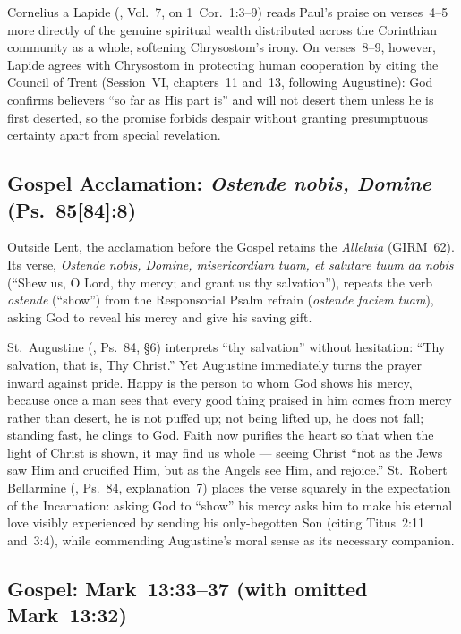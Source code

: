 Cornelius a Lapide (, Vol.~7, on 1~Cor.~1:3--9) reads Paul's praise on verses~4--5 more directly of the genuine spiritual wealth distributed across the Corinthian community as a whole, softening Chrysostom's irony. On verses~8--9, however, Lapide agrees with Chrysostom in protecting human cooperation by citing the Council of Trent (Session~VI, chapters~11 and~13, following Augustine): God confirms believers ``so far as His part is'' and will not desert them unless he is first deserted, so the promise forbids despair without granting presumptuous certainty apart from special revelation.

\subsection{Gospel Acclamation: \emph{Ostende nobis, Domine} (Ps.~85[84]:8)}

Outside Lent, the acclamation before the Gospel retains the \emph{Alleluia} (GIRM~62). Its verse, \emph{Ostende nobis, Domine, misericordiam tuam, et salutare tuum da nobis} (``Shew us, O Lord, thy mercy; and grant us thy salvation''), repeats the verb \emph{ostende} (``show'') from the Responsorial Psalm refrain (\emph{ostende faciem tuam}), asking God to reveal his mercy and give his saving gift.

St.~Augustine (, Ps.~84, §6) interprets ``thy salvation'' without hesitation: ``Thy salvation, that is, Thy Christ.'' Yet Augustine immediately turns the prayer inward against pride. Happy is the person to whom God shows his mercy, because once a man sees that every good thing praised in him comes from mercy rather than desert, he is not puffed up; not being lifted up, he does not fall; standing fast, he clings to God. Faith now purifies the heart so that when the light of Christ is shown, it may find us whole --- seeing Christ ``not as the Jews saw Him and crucified Him, but as the Angels see Him, and rejoice.'' St.~Robert Bellarmine (, Ps.~84, explanation~7) places the verse squarely in the expectation of the Incarnation: asking God to ``show'' his mercy asks him to make his eternal love visibly experienced by sending his only-begotten Son (citing Titus~2:11 and~3:4), while commending Augustine's moral sense as its necessary companion.

\subsection{Gospel: Mark~13:33--37 (with omitted Mark~13:32)}


